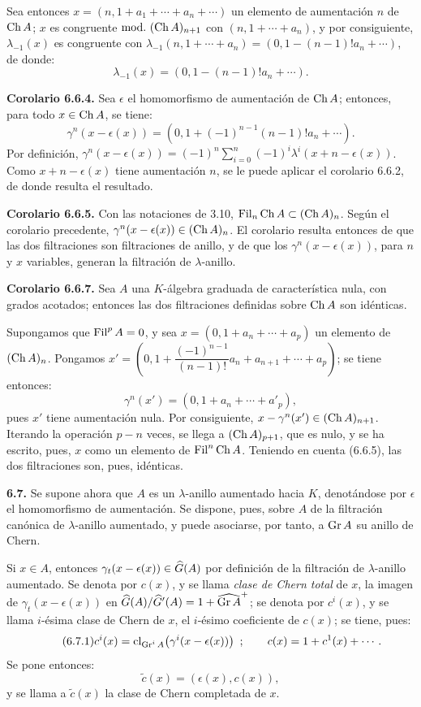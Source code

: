 Sea entonces \(x=(n,1+a_1+\cdots+a_n+\cdots)\) un elemento de aumentación \(n\) de \(\operatorname{Ch} A\); \(x\) es congruente \(\mathrm{mod.}\ (\operatorname{Ch} A)_{n+1}\) con \((n,1+\cdots+a_n)\), y por consiguiente, \(\lambda_{-1}(x)\) es congruente con \(\lambda_{-1}(n,1+\cdots+a_n)=(0,1-(n-1)!a_n+\cdots)\), de donde:
\[
  \lambda_{-1}(x)=(0,1-(n-1)!a_n+\cdots).
\]

\textbf{Corolario 6.6.4.} Sea \(\epsilon\) el homomorfismo de aumentación de \(\operatorname{Ch} A\); entonces, para todo \(x\in\operatorname{Ch} A\), se tiene:
\[
  \gamma^n(x-\epsilon(x))
  =
  (0,1+(-1)^{n-1}(n-1)!a_n+\cdots).
\]
Por definición, \(\gamma^n(x-\epsilon(x))=(-1)^n\sum_{i=0}^n(-1)^i\lambda^i(x+n-\epsilon(x))\). Como \(x+n-\epsilon(x)\) tiene aumentación \(n\), se le puede aplicar el corolario 6.6.2, de donde resulta el resultado.

\textbf{Corolario 6.6.5.} Con las notaciones de 3.10, \(\operatorname{Fil}_n\operatorname{Ch} A\subset(\operatorname{Ch} A)_n\). Según el corolario precedente, \(\gamma^n(x-\epsilon(x))\in(\operatorname{Ch} A)_n\). El corolario resulta entonces de que las dos filtraciones son filtraciones de anillo, y de que los \(\gamma^n(x-\epsilon(x))\), para \(n\) y \(x\) variables, generan la filtración de \(\lambda\)-anillo.

\textbf{Corolario 6.6.7.} Sea \(A\) una \(K\)-álgebra graduada de característica nula, con grados acotados; entonces las dos filtraciones definidas sobre \(\operatorname{Ch} A\) son idénticas.

Supongamos que \(\operatorname{Fil}^pA=0\), y sea \(x=(0,1+a_n+\cdots+a_p)\) un elemento de \((\operatorname{Ch} A)_n\). Pongamos \(x'=\left(0,1+\dfrac{(-1)^{n-1}}{(n-1)!}a_n+a_{n+1}+\cdots+a_p\right)\); se tiene entonces:
\[
  \gamma^n(x')=(0,1+a_n+\cdots+a'_p),
\]
pues \(x'\) tiene aumentación nula. Por consiguiente, \(x-\gamma^n(x')\in(\operatorname{Ch} A)_{n+1}\). Iterando la operación \(p-n\) veces, se llega a \((\operatorname{Ch} A)_{p+1}\), que es nulo, y se ha escrito, pues, \(x\) como un elemento de \(\operatorname{Fil}^n\operatorname{Ch} A\). Teniendo en cuenta (6.6.5), las dos filtraciones son, pues, idénticas.

\textbf{6.7.} Se supone ahora que \(A\) es un \(\lambda\)-anillo aumentado hacia \(K\), denotándose por \(\epsilon\) el homomorfismo de aumentación. Se dispone, pues, sobre \(A\) de la filtración canónica de \(\lambda\)-anillo aumentado, y puede asociarse, por tanto, a \(\operatorname{Gr} A\) su anillo de Chern.

Si \(x\in A\), entonces \(\gamma_t(x-\epsilon(x))\in\widehat G(A)\) por definición de la filtración de \(\lambda\)-anillo aumentado. Se denota por \(c(x)\), y se llama \emph{clase de Chern total} de \(x\), la imagen de \(\gamma_t(x-\epsilon(x))\) en \(\widehat G(A)/\widehat G'(A)=1+\widehat{\operatorname{Gr} A}^{+}\); se denota por \(c^i(x)\), y se llama \(i\)-ésima clase de Chern de \(x\), el \(i\)-ésimo coeficiente de \(c(x)\); se tiene, pues:
\begin{equation}\tag{6.7.1}
  c^i(x)=\operatorname{cl}_{\operatorname{Gr}^iA}\!\left(\gamma^i(x-\epsilon(x))\right)~;\qquad
  c(x)=1+c^1(x)+\cdots .
\end{equation}
Se pone entonces:
\begin{equation}\tag{6.7.2}
  \widetilde c(x)=(\epsilon(x),c(x)),
\end{equation}
y se llama a \(\widetilde c(x)\) la clase de Chern completada de \(x\).

